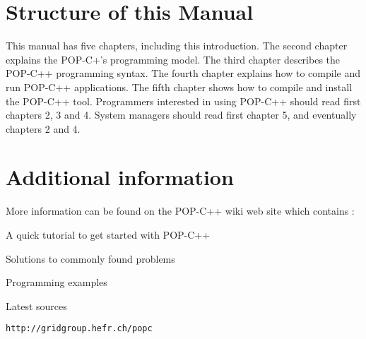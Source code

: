 \section{Structure of this Manual}

This manual has five chapters, including this introduction.
The second chapter explains the POP-C+'s programming model. The third chapter
describes the POP-C++ programming syntax. The fourth chapter explains how
to compile and run POP-C++ applications. The fifth chapter shows
how to compile and install the POP-C++ tool. Programmers interested in using
POP-C++ should read first chapters 2, 3 and 4. System managers should read
first chapter 5, and eventually chapters 2 and 4.

\section{Additional information}

More information can be found on the POP-C++ wiki web site which contains :

\begin{petitem}
\item A quick tutorial to get started with POP-C++
\item Solutions to commonly found problems
\item Programming examples
\item Latest sources
\end{petitem}

\texttt{http://gridgroup.hefr.ch/popc}

